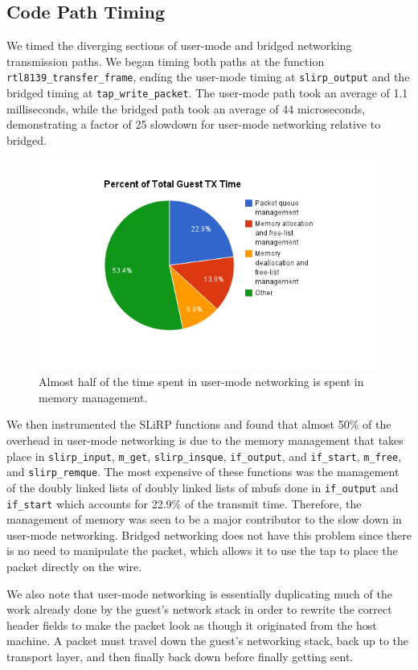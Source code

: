 \subsection{Code Path Timing}
\label{codePathTiming}
We timed the diverging sections of user-mode and bridged networking transmission paths. 
We began timing both paths at the function \texttt{rtl8139\_transfer\_frame}, ending the user-mode timing at \texttt{slirp\_output} and the bridged timing at \texttt{tap\_write\_packet}. 
The user-mode path took an average of 1.1 milliseconds, while the bridged path took an average of 44 microseconds, demonstrating a factor of 25 slowdown for user-mode networking relative to bridged.

\begin{figure}[htbp]
	\centering
		\includegraphics[scale=0.5]{usermodeTXtime}
	\caption{Almost half of the time spent in user-mode networking is spent in memory management.}
	\label{fig:usermodeTXtime}
\end{figure}

We then instrumented the SLiRP functions and found that almost 50\% of the overhead in user-mode networking is due to the memory management that takes place in \texttt{slirp\_input},
\texttt{m\_get}, \texttt{slirp\_insque}, \texttt{if\_output}, and \texttt{if\_start}, \texttt{m\_free}, and \texttt{slirp\_remque}.
The most expensive of these functions was the management of the doubly linked lists of doubly linked lists of mbufs done in \texttt{if\_output} and \texttt{if\_start} which accounts for 22.9\%
of the transmit time.
Therefore, the management of memory was seen to be a major contributor to the slow down in user-mode networking.
Bridged networking does not have this problem since there is no need to manipulate the packet, which allows it to use the tap to place the packet directly on the wire.

We also note that user-mode networking is essentially duplicating much of the work already done by the guest's network stack in order to rewrite the correct header fields to make the packet
look as though it originated from the host machine.
A packet must travel down the guest's networking stack, back up to the transport layer, and then finally back down before finally getting sent.



